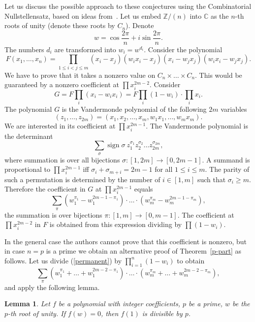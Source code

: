 \documentclass[12pt,a4paper]{amsart}
\newtheorem{lem}{Lemma}
\theoremstyle{definition}
\theoremstyle{remark}
\begin{document}
Let us discuss the possible approach to these conjectures using the Combinatorial Nullstellensatz, based on ideas from~\cite{dkss2001}. Let us embed $\mathbb Z/(n)$ into $\mathbb C$ as the $n$-th roots of unity (denote these roots by $C_n$). Denote 
$$
w = \cos \frac{2\pi}{n} + i\sin \frac{2\pi}{n}.
$$
The numbers $d_i$ are transformed into $w_i = w^{d_i}$. Consider the polynomial
$$
F(x_1,\dots,x_n)=\prod_{1\leq i< j\leq m} (x_i-x_j)(w_ix_i-x_j)(x_i-w_jx_j)(w_ix_i-w_jx_j).
$$
We have to prove that it takes a nonzero value on $C_n\times\dots\times C_n$. This would be guaranteed by a nonzero coefficient at $\prod x_i^{2m-2}$. Consider 
$$
G = F \prod_i (x_i-w_ix_i)=F \prod_i (1-w_i)\cdot \prod_i x_i.
$$
The polynomial $G$ is the Vandermonde polynomial of the following $2m$ variables
$$
(z_1,\ldots,z_{2m}) = (x_1, x_2, \ldots, x_m, w_1x_1, \ldots, w_mx_m).
$$
We are interested in its coefficient at $\prod x_i^{2m-1}$. The Vandermonde polynomial is the determinant
$$
\sum_\sigma \operatorname{sign} \sigma\  z_{1}^{\sigma_1} z_{2}^{\sigma_2}\dots z_{2m}^{\sigma_{2m}},
$$
where summation is over all bijections $\sigma : [1,2m]\to [0,2m-1]$. A summand is proportional to $\prod x_i^{2m-1}$ iff $\sigma_i+\sigma_{m+i}=2m-1$ for all $1\leq i\leq m$. The parity of such a permutation is determined by the number of $i\in [1,m]$ such that $\sigma_i\geq m$. Therefore the coefficient in $G$ at $\prod x_i^{2m-1}$ equals
\begin{equation}
\label{permanent}
\sum_\pi (w_1^{\pi_1}-w_1^{2m-1-\pi_1})\cdot \dots \cdot (w_m^{\pi_m}-w_m^{2m-1-\pi_m}),
\end{equation}
the summation is over bijections $\pi : [1,m]\to [0,m-1]$. The coefficient at $\prod x_i^{2m-2}$ in $F$ is obtained from this expression dividing by $\prod(1-w_i)$.

In the general case the authors cannot prove that this coefficient is nonzero, but in case $n=p$ is a prime we obtain an alternative proof of Theorem~\ref{p-part} as follows. Let us divide (\ref{permanent}) by $\prod_{i=1}^n (1 - w_i)$ to obtain 
\begin{equation}
\label{permanent2}
\sum_\pi (w_1^{\pi_1}+\dots + w_1^{2m-2-\pi_1})\cdot \dots \cdot (w_m^{\pi_m}+\dots+w_m^{2m-2-\pi_m}),
\end{equation}
and apply the following lemma.

\begin{lem}
Let $f$ be a polynomial with integer coefficients, $p$ be a prime, $w$ be the $p$-th root of unity. If $f(w)=0$, then $f(1)$ is divisible by $p$.
\end{lem}
\end{document}
